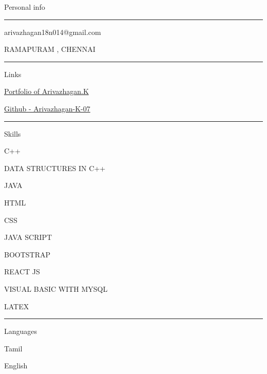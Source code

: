 \documentclass{letter}
\begin{document}
\begin{minipage}[t]{0.40\textwidth}
\setlength{\baselineskip}{1.5\baselineskip}
\color{white}
\vspace{1cm}
{\large Personal info}

\rule{\linewidth}{0.4pt}

\faPhone {}


\faEnvelope \quad arivazhagan18n014@gmail.com


\faMapMarker \quad RAMAPURAM , CHENNAI

\rule{\linewidth}{0.4pt}

{\large Links}

\faCode \quad \href{https://arivazhagan-k-07.github.io/Arivazhgan07_MY-portfolio/}{Portfolio of Arivazhagan.K}

\faGithub \quad \href{https://github.com/Arivazhagan-K-07?tab=repositories}{Github - Arivazhagan-K-07}

\rule{\linewidth}{0.4pt}

{\large Skills}

\faCircleNotch \quad  C++ 

\faCircleNotch \quad  DATA STRUCTURES IN C++

\faCircleNotch \quad  JAVA

\faCircleNotch \quad  HTML

\faCircleNotch \quad  CSS

\faCircleNotch \quad  JAVA SCRIPT

\faCircleNotch \quad  BOOTSTRAP

\faCircleNotch \quad  REACT JS

\faCircleNotch \quad  VISUAL BASIC WITH MYSQL

\faCircleNotch \quad  LATEX



\rule{\linewidth}{0.4pt}

{\large Languages}

\faLanguage \quad Tamil 

\faLanguage \quad English

\end{minipage}
\hfill
\end{document}
